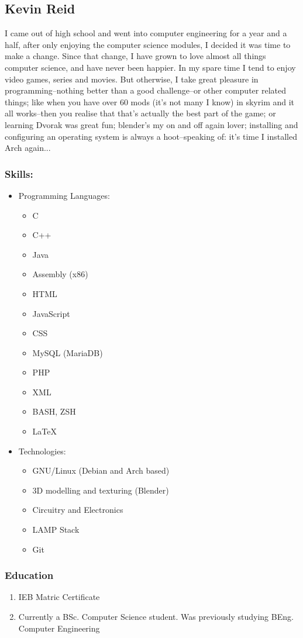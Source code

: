 \documentclass[12pt]{article}
\begin{document}
	\subsection*{Kevin Reid}
	I came out of high school and went into computer engineering for a year and a half, after only enjoying the computer science modules, I decided it was time to make a change. Since that change, I have grown to love almost all things computer science, and have never been happier.\newline
	In my spare time I tend to enjoy video games, series and movies. But otherwise, I take great pleasure in programming--nothing better than a good challenge--or other computer related things; like when you have over 60 mods (it's not many I know) in skyrim and it all works--then you realise that that's actually the best part of the game; or learning Dvorak was great fun; blender's my on and off again lover; installing and configuring an operating system is always a hoot--speaking of: it's time I installed Arch again...
	
	\subsubsection*{Skills:}
	\begin{itemize}
	\item Programming Languages:
	\begin{itemize}
	\item C
	\item C++
	\item Java
	\item Assembly (x86)
	\item HTML
	\item JavaScript
	\item CSS
	\item MySQL (MariaDB)
	\item PHP
	\item XML
	\item BASH, ZSH
	\item LaTeX
	\end{itemize}
	\item Technologies:
	\begin{itemize}
	\item GNU/Linux (Debian and Arch based)
	\item 3D modelling and texturing (Blender)
	\item Circuitry and Electronics
	\item LAMP Stack
	\item Git
	\end{itemize}
	\end{itemize}	
	
	\subsubsection*{Education}
	\begin{enumerate}
	\item IEB Matric Certificate
	\item Currently a BSc. Computer Science student. Was previously studying BEng. Computer Engineering
	\end{enumerate}		
\end{document}
